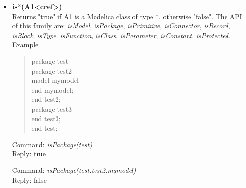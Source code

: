 \documentclass[11pt,a4paper,oneside,english]{book}
\newenvironment{modelicaExamples}{\begin{itemize}}{\end{itemize}}
\newcommand{\api}[2]{\item \textbf{#1} \\ #2}
\newcommand{\tab}{\hspace{2em}}
\newcommand{\command}[1]{Command: \textit{#1}\\}
\newcommand{\reply}[1]{Reply: #1}
\newcommand{\functionex}[2]{\begin{singlespace} \command{#1} \reply{#2} \end{singlespace}}
\newcommand{\examples}{Example}
\newenvironment{mocode}{\begin{verse}\begin{singlespace}\begin{scriptsize}\ttfamily}{\end{scriptsize}\end{singlespace}\end{verse}}
\begin{document}
\begin{modelicaExamples}
		\api{is*(A1<cref>)}{Returns "true" if A1 is a Modelica class of type *, otherwise "false". The API of this family are: \textit{isModel}, \textit{isPackage}, \textit{isPrimitive}, \textit{isConnector}, \textit{isRecord}, \textit{isBlock}, \textit{isType}, \textit{isFunction}, \textit{isClass}, \textit{isParameter}, \textit{isConstant}, \textit{isProtected}. \\ \examples
			\begin{mocode}
				package test\\
				\tab package test2\\
				\tab\tab model mymodel\\
				\tab\tab end mymodel;\\
				\tab end test2;\\
				\tab package test3\\
				\tab end test3;\\
				end test;\\
			\end{mocode}
			\functionex{isPackage(test)}
			{true}
			\functionex{isPackage(test.test2.mymodel)}
			{false}
		}


\end{modelicaExamples}
\end{document}
